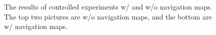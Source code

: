 \documentclass[letterpaper,10 pt,conference]{ieeeconf}  %
\begin{document}
\begin{figure}
{    }
    \quad
    \caption{The results of controlled experiments w/ and w/o navigation maps. The top two pictures are w/o navigation maps, and the bottom are w/ navigation maps.}
    \label{without_navg_map}
\end{figure}
\end{document}
